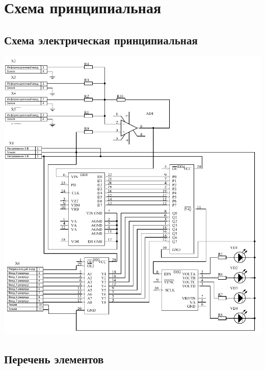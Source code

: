 \chapter{Схема принципиальная}
	\section{Схема электрическая принципиальная}
		\begin{center}
			\includegraphics[width=180mm]{src/pictures/schemep3.png}
		\end{center}
		\newpage
	\section{Перечень элементов}
		
